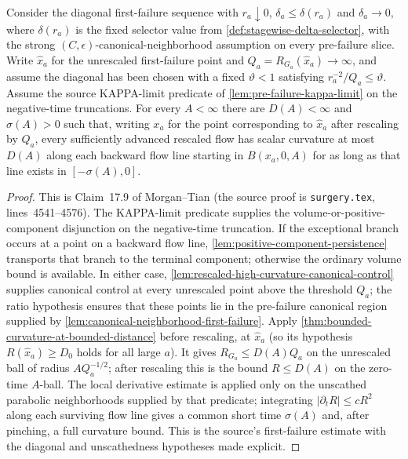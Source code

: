 \begin{lemma}
\label{lem:short-backward-curvature-control}
\notready
Consider the diagonal first-failure sequence with $r_a\downarrow0$,
$\delta_a\le\delta(r_a)$ and $\delta_a\to0$, where $\delta(r_a)$ is the fixed
selector value from \ref{def:stagewise-delta-selector}, with the strong
$(C,\epsilon)$-canonical-neighborhood assumption on every pre-failure slice.
Write $\widehat x_a$ for the unrescaled first-failure point and
$Q_a=R_{G_a}(\widehat x_a)\to\infty$, and assume the diagonal has been chosen
with a fixed $\vartheta<1$ satisfying
$r_a^{-2}/Q_a\le\vartheta$.
Assume the source KAPPA-limit predicate of
\ref{lem:pre-failure-kappa-limit} on the negative-time truncations.  For
every $A<\infty$ there are $D(A)<\infty$ and $\sigma(A)>0$ such that,
writing $x_a$ for the point corresponding to $\widehat x_a$ after rescaling by
$Q_a$, every sufficiently advanced rescaled flow has scalar curvature at most
$D(A)$ along each
backward flow line starting in $B(x_a,0,A)$ for as long as that line exists
in $[-\sigma(A),0]$.
\end{lemma}

\begin{proof}
This is Claim~17.9 of Morgan--Tian (the source proof is
\texttt{surgery.tex}, lines~4541--4576).  The KAPPA-limit predicate
supplies the volume-or-positive-component disjunction on the negative-time
truncation.  If the exceptional branch occurs at a point on a backward flow
line, \ref{lem:positive-component-persistence} transports that branch to the
terminal component; otherwise the ordinary volume bound is available.  In
either case, \ref{lem:rescaled-high-curvature-canonical-control} supplies
canonical control at every unrescaled point above the threshold $Q_a$; the
ratio hypothesis ensures that these points lie in the pre-failure canonical
region supplied by \ref{lem:canonical-neighborhood-first-failure}.
Apply \ref{thm:bounded-curvature-at-bounded-distance} before rescaling, at
$\widehat x_a$ (so its hypothesis $R(\widehat x_a)\ge D_0$ holds for all
large $a$).  It gives $R_{G_a}\le D(A)Q_a$ on the unrescaled ball of radius
$A Q_a^{-1/2}$; after rescaling this is the bound $R\le D(A)$ on the
zero-time $A$-ball.  The local derivative estimate is applied only on the
unscathed parabolic neighborhoods supplied by that predicate; integrating
$|\partial_tR|\le cR^2$ along each surviving flow line gives a common short
time $\sigma(A)$ and, after pinching, a full curvature bound.  This is the
source's first-failure estimate with the diagonal and unscathedness
hypotheses made explicit.
\end{proof}

